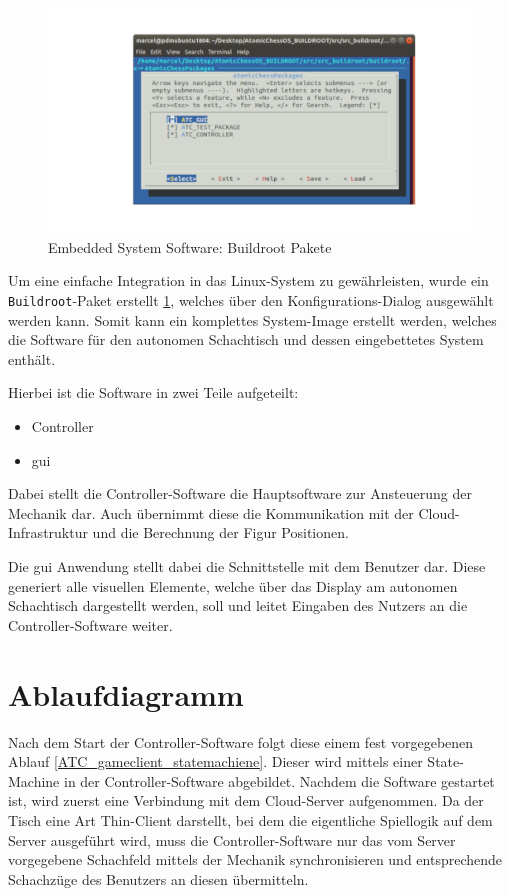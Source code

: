 \begin{figure}
\centering
\includegraphics{images/buildroot_packages_1.png}
\caption{Embedded System Software: Buildroot Pakete
\label{buildroot_packages_1}}
\end{figure}

Um eine einfache Integration in das Linux-System zu gewährleisten, wurde
ein \passthrough{\lstinline!Buildroot!}-Paket erstellt
\ref{buildroot_packages_1}, welches über den Konfigurations-Dialog
ausgewählt werden kann. Somit kann ein komplettes System-Image erstellt
werden, welches die Software für den autonomen Schachtisch und dessen
eingebettetes System enthält.

Hierbei ist die Software in zwei Teile aufgeteilt:

\begin{itemize}
\tightlist
\item
  Controller
\item
  \gls{gui}
\end{itemize}

Dabei stellt die Controller-Software die Hauptsoftware zur Ansteuerung
der Mechanik dar. Auch übernimmt diese die Kommunikation mit der
Cloud-Infrastruktur und die Berechnung der Figur Positionen.

Die \gls{gui} Anwendung stellt dabei die Schnittstelle mit dem Benutzer
dar. Diese generiert alle visuellen Elemente, welche über das Display am
autonomen Schachtisch dargestellt werden, soll und leitet Eingaben des
Nutzers an die Controller-Software weiter.

\hypertarget{ablaufdiagramm}{%
\section{Ablaufdiagramm}\label{ablaufdiagramm}}

Nach dem Start der Controller-Software folgt diese einem fest
vorgegebenen Ablauf \ref{ATC_gameclient_statemachiene}. Dieser wird
mittels einer State-Machine in der Controller-Software abgebildet.
Nachdem die Software gestartet ist, wird zuerst eine Verbindung mit dem
Cloud-Server aufgenommen. Da der Tisch eine Art Thin-Client darstellt,
bei dem die eigentliche Spiellogik auf dem Server ausgeführt wird, muss
die Controller-Software nur das vom Server vorgegebene Schachfeld
mittels der Mechanik synchronisieren und entsprechende Schachzüge des
Benutzers an diesen übermitteln.

